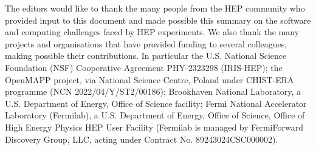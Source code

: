 \documentclass[10pt,a4paper]{article}
\begin{document}
The editors would like to thank the many people from the HEP community who provided input to this document and made possible this summary on the software and computing challenges faced by HEP experiments. We also thank the many projects and organisations that have provided funding to several colleagues, making possible their contributions. In particular the U.S. National Science Foundation (NSF) Cooperative Agreement PHY-2323298 (IRIS-HEP); the OpenMAPP project, via National Science Centre, Poland under CHIST-ERA programme (NCN 2022/04/Y/ST2/00186); Brookhaven National Laboratory, a U.S. Department of Energy, Office of Science facility; Fermi National Accelerator Laboratory (Fermilab), a U.S. Department of Energy, Office of Science, Office of High Energy Physics HEP User Facility (Fermilab is managed by FermiForward Discovery Group, LLC, acting under Contract No. 89243024CSC000002).

\clearpage

\printglossaries

\newpage
\sloppy
\printbibliography
\end{document}

